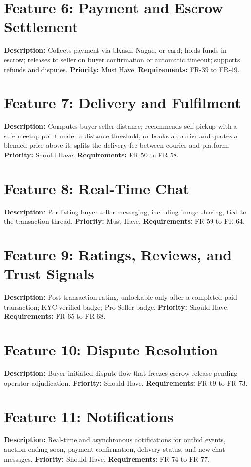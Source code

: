 \documentclass[11pt,a4paper]{report}
\begin{document}
\section{Feature 6: Payment and Escrow Settlement}
\textbf{Description:} Collects payment via bKash, Nagad, or card; holds funds in escrow; releases to seller on buyer confirmation or automatic timeout; supports refunds and disputes. \textbf{Priority:} Must Have. \textbf{Requirements:} FR-39 to FR-49.

\section{Feature 7: Delivery and Fulfilment}
\textbf{Description:} Computes buyer-seller distance; recommends self-pickup with a safe meetup point under a distance threshold, or books a courier and quotes a blended price above it; splits the delivery fee between courier and platform. \textbf{Priority:} Should Have. \textbf{Requirements:} FR-50 to FR-58.

\section{Feature 8: Real-Time Chat}
\textbf{Description:} Per-listing buyer-seller messaging, including image sharing, tied to the transaction thread. \textbf{Priority:} Must Have. \textbf{Requirements:} FR-59 to FR-64.

\section{Feature 9: Ratings, Reviews, and Trust Signals}
\textbf{Description:} Post-transaction rating, unlockable only after a completed paid transaction; KYC-verified badge; Pro Seller badge. \textbf{Priority:} Should Have. \textbf{Requirements:} FR-65 to FR-68.

\section{Feature 10: Dispute Resolution}
\textbf{Description:} Buyer-initiated dispute flow that freezes escrow release pending operator adjudication. \textbf{Priority:} Should Have. \textbf{Requirements:} FR-69 to FR-73.

\section{Feature 11: Notifications}
\textbf{Description:} Real-time and asynchronous notifications for outbid events, auction-ending-soon, payment confirmation, delivery status, and new chat messages. \textbf{Priority:} Should Have. \textbf{Requirements:} FR-74 to FR-77.
\end{document}
